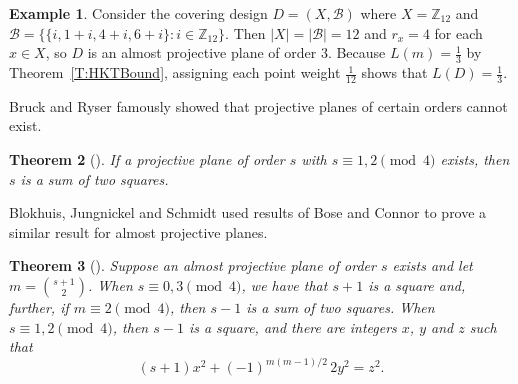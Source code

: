 \documentclass[11pt]{article}
\newtheorem{Theorem}{Theorem}[section]
\theoremstyle{definition}
\newtheorem{Example}[Theorem]{Example}
\newcommand{\B}{{\ensuremath{\mathcal{B}}}}
\def \mod{\pmod}
\begin{document}
\begin{Example}
\label{X:Z12}
Consider the covering design $D=(X,\B)$ where $X=\mathbb{Z}_{12}$ and $\B=\{\{i,1+i,4+i,6+i\}:i \in \mathbb{Z}_{12}\}$. Then $|X|=|\B|=12$ and $r_x=4$ for each $x \in X$, so $D$ is an almost projective plane of order 3. Because $L(m)=\frac{1}{3}$ by Theorem~\ref{T:HKTBound}, assigning each point weight $\frac{1}{12}$ shows that $L(D)=\frac{1}{3}$.
\end{Example}

Bruck and Ryser \cite{BruRys} famously showed that projective planes of certain orders cannot exist.

\begin{Theorem}[{\cite{BruRys}}]\label{T:PPnonexistence}
If a projective plane of order $s$ with $s \equiv 1,2 \mod{4}$ exists, then $s$ is a sum of two squares.
\end{Theorem}

 Blokhuis, Jungnickel and Schmidt \cite[Proposition 1.2]{BloJunSch} used results of Bose and Connor \cite{BosCon} to prove a similar result for almost projective planes.

\begin{Theorem}[{\cite{BloJunSch}}]\label{T:APPnonexistence}
Suppose an almost projective plane of order $s$ exists and let $m = \binom{s+1}{2}$. When $s \equiv 0,3 \mod{4}$, we have that $s+1$ is a square and, further, if $m \equiv 2 \mod{4}$, then $s-1$ is a sum of two squares. When $s \equiv 1,2 \mod{4}$, then $s-1$ is a square, and there are integers $x$, $y$ and $z$ such that
\[(s+1)x^2 + (-1)^{m(m-1)/2}\, 2y^2 = z^2.\]
\end{Theorem}
\end{document}
